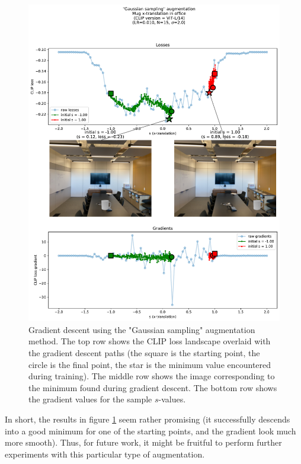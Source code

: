 \begin{figure}[H]
    \centering
    \includegraphics[width=1.0\textwidth]{figures/4_gaussian-sampling-gd.pdf}
    \caption{Gradient descent using the "Gaussian sampling" augmentation method. The top row shows the CLIP loss landscape overlaid with the gradient descent paths (the square is the starting point, the circle is the final point, the star is the minimum value encountered during training). The middle row shows the image corresponding to the minimum found during gradient descent. The bottom row shows the gradient values for the sample $s$-values.}
    \label{fig:4_gaussian-sampling-gd}
\end{figure}

In short, the results in figure \ref{fig:4_gaussian-sampling-gd} seem rather promising (it successfully descends into a good minimum for one of the starting points, and the gradient look much more smooth). Thus, for future work, it might be fruitful to perform further experiments with this particular type of augmentation.

